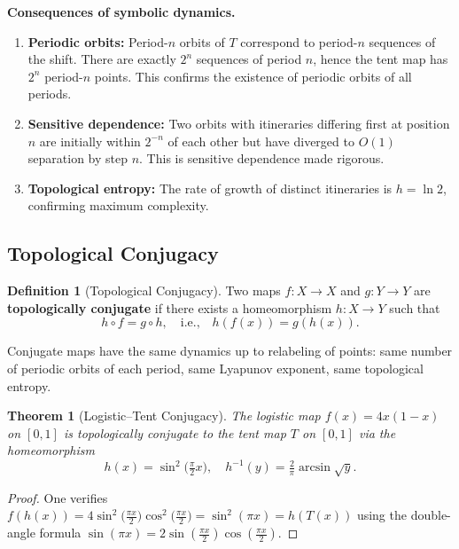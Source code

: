 \documentclass[11pt,letterpaper]{article}
\theoremstyle{definition}
\newtheorem{definition}{Definition}[section]
\theoremstyle{plain}
\newtheorem{theorem}{Theorem}[section]
\theoremstyle{remark}
\begin{document}
\textbf{Consequences of symbolic dynamics.}
\begin{enumerate}[leftmargin=2em]
  \item \textbf{Periodic orbits:} Period-$n$ orbits of $T$ correspond
    to period-$n$ sequences of the shift.  There are exactly $2^n$
    sequences of period $n$, hence the tent map has $2^n$ period-$n$
    points.  This confirms the existence of periodic orbits of all periods.
  \item \textbf{Sensitive dependence:}  Two orbits with itineraries
    differing first at position $n$ are initially within $2^{-n}$ of
    each other but have diverged to $O(1)$ separation by step $n$.
    This is sensitive dependence made rigorous.
  \item \textbf{Topological entropy:}  The rate of growth of distinct
    itineraries is $h = \ln 2$, confirming maximum complexity.
\end{enumerate}

\subsection{Topological Conjugacy}

\begin{definition}[Topological Conjugacy]
Two maps $f:X\to X$ and $g:Y\to Y$ are \textbf{topologically conjugate}
if there exists a homeomorphism $h:X\to Y$ such that
\begin{equation}
  h \circ f = g \circ h, \quad\text{i.e.,}\quad
  h(f(x)) = g(h(x)).
\end{equation}
\end{definition}

Conjugate maps have the same dynamics up to relabeling of points:
same number of periodic orbits of each period, same Lyapunov exponent,
same topological entropy.

\begin{theorem}[Logistic--Tent Conjugacy]
The logistic map $f(x) = 4x(1-x)$ on $[0,1]$ is topologically conjugate
to the tent map $T$ on $[0,1]$ via the homeomorphism
\begin{equation}
  h(x) = \sin^2\!\bigl(\tfrac{\pi}{2}x\bigr), \quad
  h^{-1}(y) = \tfrac{2}{\pi}\arcsin\sqrt{y}.
\end{equation}
\end{theorem}
\begin{proof}
One verifies $f(h(x)) = 4\sin^2\!\bigl(\tfrac{\pi x}{2}\bigr)
\cos^2\!\bigl(\tfrac{\pi x}{2}\bigr) = \sin^2(\pi x) = h(T(x))$
using the double-angle formula $\sin(\pi x) = 2\sin(\tfrac{\pi x}{2})
\cos(\tfrac{\pi x}{2})$.
\end{proof}
\end{document}
